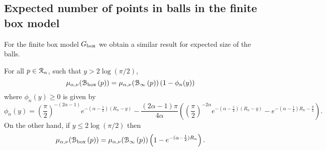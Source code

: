\subsection{Expected number of points in balls in the finite box model}\label{ssec:average_degree_P_n}

For the finite box model $G_{\text{box}}$ we obtain a similar result for expected size of the balls.

\begin{lemma}\label{lem:average_degree_P_n}
For all $p \in {\mathcal R}_n$, such that $y > 2\log(\pi/2)$,
\[
	\mu_{\alpha,\nu}({\mathcal B}_{\text{box}}\left(p\right)) = \mu_{\alpha,\nu}({\mathcal B}_{\infty}\left(p\right))\left(1 - \phi_n(y)\right)
\]
where $\phi_n(y) \ge 0$ is given by
\[
	\phi_n(y) = \left(\frac{\pi}{2}\right)^{-(2\alpha - 1)}e^{-(\alpha-\frac{1}{2})(R_n - y)}
	- \frac{(2\alpha - 1)\pi}{4\alpha}\left(\left(\frac{\pi}{2}\right)^{-2\alpha} 
	e^{-(\alpha - \frac{1}{2})(R_n - y)} - e^{-(\alpha - \frac{1}{2})R_n - \frac{y}{2}}\right).
\]
On the other hand, if $y \le 2 \log(\pi/2)$ then
\[
	\mu_{\alpha,\nu}({\mathcal B}_{\text{box}}\left(p\right)) = \mu_{\alpha,\nu}({\mathcal B}_{\infty}\left(p\right))\left(1 - e^{-(\alpha - \frac{1}{2})R_n}\right).
\]
\end{lemma}


